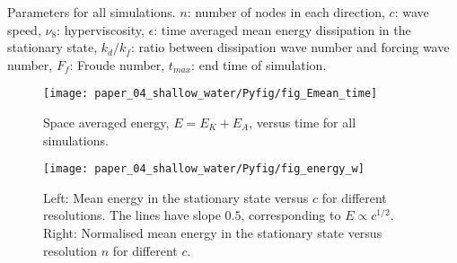 \begin{table}
\begin{center}
\vskip 3mm
\caption{Parameters for all simulations. $ n $: number of nodes in each
direction, $ c $: wave speed, $ \nu_8 $: hyperviscosity, $ \epsilon $: time
averaged mean energy dissipation in the stationary state, $ k_{d}/ k_f $: ratio
between dissipation wave number and forcing wave number, $ F_f $: Froude
number, $ t_{max} $: end time of simulation.}
\end{center}
\end{table}





\begin{figure}
\centerline{\texttt{[image: paper\_04\_shallow\_water/Pyfig/fig\_Emean\_time]}}
\caption{Space averaged energy, $E = E_K + E_A $, versus time for all
simulations. }
\label{fig_Evstime}
\end{figure}

\begin{figure}
\centerline{\texttt{[image: paper\_04\_shallow\_water/Pyfig/fig\_energy\_w]}}
\caption{Left: Mean energy in the stationary state versus $ c $ for different
resolutions. The lines have slope $ 0.5 $, corresponding to $ E \propto c^{1/2}
$. Right: Normalised mean energy in the stationary state versus resolution $ n
$ for different $ c $.}
\label{MeanE}
\end{figure}



